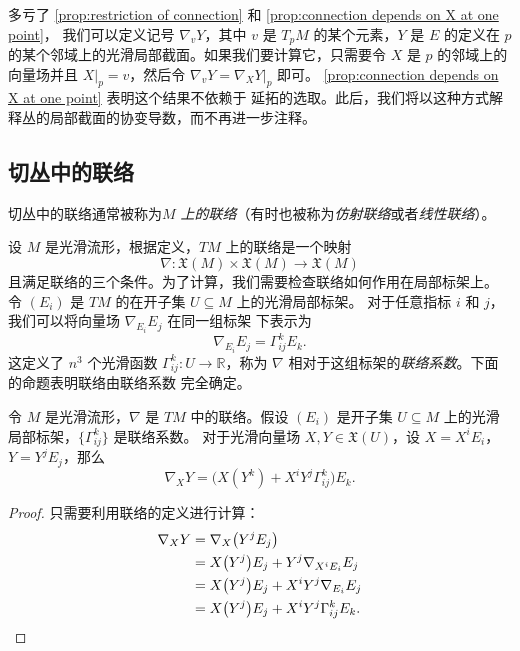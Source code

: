 多亏了 \autoref{prop:restriction of connection} 和 \autoref{prop:connection depends on X at one point}，
我们可以定义记号 $\nabla_vY$，其中 $v$ 是 $T_pM$ 的某个元素，$Y$ 是 $E$ 的定义在
$p$ 的某个邻域上的光滑局部截面。如果我们要计算它，只需要令 $X$ 是 $p$
的邻域上的向量场并且 $X|_p=v$，然后令 $\nabla_vY=\nabla_XY|_p$ 即可。
\autoref{prop:connection depends on X at one point} 表明这个结果不依赖于
延拓的选取。此后，我们将以这种方式解释丛的局部截面的协变导数，而不再进一步注释。

\subsection{切丛中的联络}

切丛中的联络通常被称为\emph{$M$ 上的联络}（有时也被称为\emph{仿射联络}或者\emph{线性联络}）。

设 $M$ 是光滑流形，根据定义，$TM$ 上的联络是一个映射
\[
  \nabla:\mathfrak{X}(M)\times \mathfrak{X}(M)\to \mathfrak{X}(M)  
\]
且满足联络的三个条件。为了计算，我们需要检查联络如何作用在局部标架上。
令 $(E_i)$ 是 $TM$ 的在开子集 $U\subseteq M$ 上的光滑局部标架。
对于任意指标 $i$ 和 $j$，我们可以将向量场 $\nabla_{E_i}E_j$ 在同一组标架
下表示为
\begin{equation}
  \nabla_{E_i}E_j=\Gamma_{ij}^k E_k.
\end{equation}
这定义了 $n^3$ 个光滑函数 $\Gamma_{ij}^k:U\to \mathbb{R}$，称为
$\nabla$ 相对于这组标架的\emph{联络系数}。下面的命题表明联络由联络系数
完全确定。

\begin{proposition}
  令 $M$ 是光滑流形，$\nabla$ 是 $TM$ 中的联络。假设 $(E_i)$ 是开子集
  $U\subseteq M$ 上的光滑局部标架，$\{\Gamma_{ij}^k\}$ 是联络系数。
  对于光滑向量场 $X,Y\in \mathfrak{X}(U)$，设 $X=X^iE_i$，
  $Y=Y^jE_j$，那么
  \begin{equation}
    \nabla_XY=\bigl(X(Y^k)+X^iY^j\Gamma_{ij}^k\bigr)E_k.
  \end{equation}
\end{proposition}
\begin{proof}
  只需要利用联络的定义进行计算：
  \begin{align*}
    \nabla_XY&=\nabla_X\bigl(Y^jE_j\bigr)\\
    &=X\bigl(Y^j\bigr)E_j+Y^j\nabla_{X^iE_i}E_j\\
    &=X\bigl(Y^j\bigr)E_j+X^iY^j\nabla_{E_i}E_j\\
    &=X\bigl(Y^j\bigr)E_j+X^iY^j\Gamma_{ij}^kE_k.\qedhere
  \end{align*}
\end{proof}

